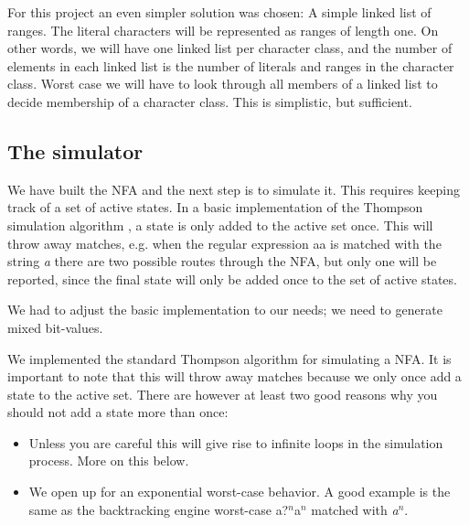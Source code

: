 For this project an even simpler solution was chosen: A simple linked
list of ranges. The literal characters will be represented as ranges
of length one. On other words, we will have one linked list per
character class, and the number of elements in each linked list is the
number of literals and ranges in the character class. Worst case we
will have to look through all members of a linked list to decide
membership of a character class. This is simplistic, but sufficient.


\subsection{The simulator}

We have built the NFA and the next step is to simulate it. This
requires keeping track of a set of active states. In a basic
implementation of the Thompson simulation algorithm
\cite{Thompson1968}, a state is only added to the active set
once. This will throw away matches, e.g. when the regular expression
\textsf{a\textbar a} is matched with the string \textsl{a} there are
two possible routes through the NFA, but only one will be reported,
since the final state will only be added once to the set of active
states.

We had to adjust the basic implementation to our needs; we need to
generate mixed bit-values. 

We implemented the standard Thompson algorithm for simulating a
NFA. It is important to note that this will throw away matches because
we only once add a state to the active set. There are however at least
two good reasons why you should not add a state more than once:
\begin{itemize}
\item Unless you are careful this will give rise to infinite loops in
  the simulation process. More on this below.
\item We open up for an exponential worst-case behavior. A good
  example is the same as the backtracking engine worst-case
  \textsf{a?$^n$a$^n$} matched with \textsl{a$^n$}. 
\end{itemize}

